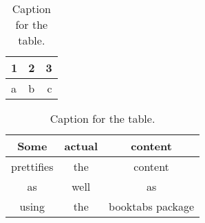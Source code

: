 \documentclass{article}
\begin{document}
\begin{table}[h!]
  \centering
  \caption{Caption for the table.}
  \label{tab:table1}
  \begin{tabular}{l|c||r}
    1 & 2 & 3 \\
    \hline
    a & b & c
  \end{tabular}
\end{table}


\begin{table}[h!]
  \centering
  \caption{Caption for the table.}
  \label{tab:table2}
  \begin{tabular}{ccc}
    \toprule
    Some & actual & content\\
    \midrule
    prettifies & the & content\\
    as & well & as\\
    using & the & booktabs package\\
    \bottomrule
  \end{tabular}
\end{table}
\end{document}
